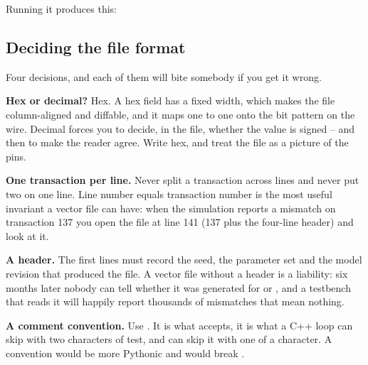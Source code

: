Running it produces this:



\subsection{Deciding the file format}

Four decisions, and each of them will bite somebody if you get it wrong.

\textbf{Hex or decimal?} Hex. A hex field has a fixed width, which makes the
file column-aligned and diffable, and it maps one to one onto the bit pattern
on the wire. Decimal forces you to decide, in the file, whether the value is
signed -- and then to make the reader agree. Write hex, and treat the file as
a picture of the pins.

\textbf{One transaction per line.} Never split a transaction across lines and
never put two on one line. Line number equals transaction number is the most
useful invariant a vector file can have: when the simulation reports a
mismatch on transaction 137 you open the file at line 141 (137 plus the
four-line header) and look at it.

\textbf{A header.} The first lines must record the seed, the parameter set
and the model revision that produced the file. A vector file without a header
is a liability: six months later nobody can tell whether it was generated for
 or , and a testbench that reads it will happily
report thousands of mismatches that mean nothing.

\textbf{A comment convention.} Use \code{//}. It is what 
accepts, it is what a C++  loop can skip with two characters
of test, and  can skip it with one  of a
character. A \code{\#} convention would be more Pythonic and would break
.

